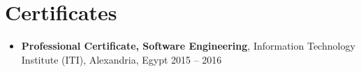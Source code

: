 \documentclass[a4paper,10pt]{article}
\begin{document}
\section*{Certificates}
\begin{itemize}[leftmargin=0.5cm]
    \item \textbf{Professional Certificate, Software Engineering}, Information Technology Institute (ITI), Alexandria, Egypt \hfill 2015 – 2016 
\end{itemize}
\end{document}
